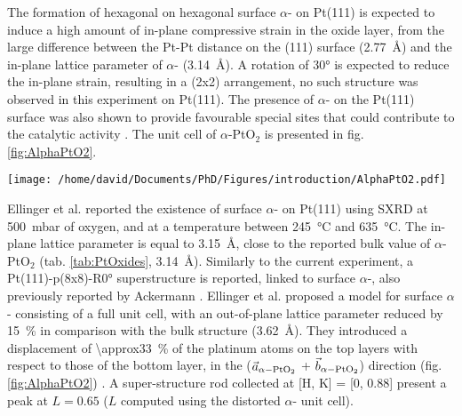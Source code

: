 The formation of hexagonal on hexagonal surface $\alpha$- on Pt(111) is expected to induce a high amount of in-plane compressive strain in the oxide layer, from the large difference between the Pt-Pt distance on the (111) surface (\qty{2.77}{\angstrom}) and the in-plane lattice parameter of $\alpha$- (\qty{3.14}{\angstrom}).
A rotation of \ang{30} is expected to reduce the in-plane strain, resulting in a (2x2) arrangement, no such structure was observed in this experiment on Pt(111).
The presence of $\alpha$- on the Pt(111) surface was also shown to provide favourable special sites that could contribute to the catalytic activity \parencite{Li2005}.
The unit cell of $\alpha$-PtO$_2$ is presented in fig. \ref{fig:AlphaPtO2}.

\begin{SCfigure}
    \centering
    \texttt{[image: /home/david/Documents/PhD/Figures/introduction/AlphaPtO2.pdf]}
    \caption{
        $\alpha$- bulk unit cell.
        Platinum atoms are situated on the unit cell corners (blue) while the two oxygen atoms are at the positions $(1/3, 2/3, 1/4)$ and $(2/3, 1/3, 3/4)$ (orange).
    }
    \label{fig:AlphaPtO2}
\end{SCfigure}

Ellinger et al. \parencite*{Ellinger2008} reported the existence of surface $\alpha$- on Pt(111) using SXRD at \qty{500}{\milli\bar} of oxygen, and at a temperature between \qty{245}{\degreeCelsius} and \qty{635}{\degreeCelsius}.
The in-plane lattice parameter is equal to \qty{3.15}{\angstrom}, close to the reported bulk value of $\alpha$-PtO$_2$ (tab. \ref{tab:PtOxides}, \qty{3.14}{\angstrom}).
Similarly to the current experiment, a Pt(111)-p(8x8)-R\ang{0} superstructure is reported, linked to surface $\alpha$-,  also previously reported by Ackermann \parencite*{Ackermann2007}.
Ellinger et al. \parencite*{Ellinger2008} proposed a model for surface $\alpha$- consisting of a full unit cell, with an out-of-plane lattice parameter reduced by \qty{15}{\percent} in comparison with the bulk structure (\qty{3.62}{\angstrom}).
They introduced a displacement of \qty{\approx33}{\percent} of the platinum atoms on the top layers with respect to those of the bottom layer, in the ($\vec{a}_{\alpha-\ce{PtO_2}}$ + $\vec{b}_{\alpha-\ce{PtO_2}}$) direction (fig. \ref{fig:AlphaPtO2}) .
A super-structure rod collected at [H, K] = [0, 0.88] present a peak at $L=0.65$ ($L$ computed using the distorted $\alpha$- unit cell).

